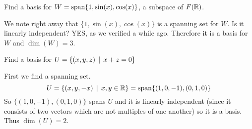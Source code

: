 \begin{myprob} Find a basis for  $W = \textrm{span}\{1, \sin(x), \cos(x)\}$, a subspace of $F(\mathbb{R})$.

\begin{mysol} We note right away that $\{ 1, \sin(x), \cos(x)\}$ is a spanning set for
$W$.  Is it linearly independent?  YES, as we verified a while ago.
Therefore it is a basis for $W$ and $\dim(W) = 3$. \end{mysol}\end{myprob}

\begin{myprob} Find a basis for $U = \{ (x,y,z) \,\mid \, x+z = 0\}$

\begin{mysol} First we find a spanning set.  
$$
U = \{ (x,y,-x) \,\mid \, x,y \in \mathbb{R}\} = \textrm{span}\{(1,0,-1), (0,1,0)\}
$$
So $\{(1,0,-1), (0,1,0)\}$ spans $U$ and it is linearly independent
(since it consists of two vectors which are not multiples of one 
another) so it is a basis.  Thus $\dim(U)=2$.
\end{mysol}\end{myprob}


